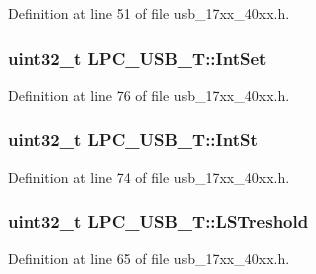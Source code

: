 Definition at line 51 of file usb\+\_\+17xx\+\_\+40xx.\+h.

\subsubsection[{\texorpdfstring{Int\+Set}{IntSet}}]{ uint32\+\_\+t L\+P\+C\+\_\+\+U\+S\+B\+\_\+\+T\+::\+Int\+Set}\hypertarget{structLPC__USB__T_a488e9c8d68d0ec88dd676f1349ac2723}{}\label{structLPC__USB__T_a488e9c8d68d0ec88dd676f1349ac2723}


Definition at line 76 of file usb\+\_\+17xx\+\_\+40xx.\+h.

\subsubsection[{\texorpdfstring{Int\+St}{IntSt}}]{ uint32\+\_\+t L\+P\+C\+\_\+\+U\+S\+B\+\_\+\+T\+::\+Int\+St}\hypertarget{structLPC__USB__T_aaf1cf56868212831767e9907378a342e}{}\label{structLPC__USB__T_aaf1cf56868212831767e9907378a342e}


Definition at line 74 of file usb\+\_\+17xx\+\_\+40xx.\+h.

\subsubsection[{\texorpdfstring{L\+S\+Treshold}{LSTreshold}}]{ uint32\+\_\+t L\+P\+C\+\_\+\+U\+S\+B\+\_\+\+T\+::\+L\+S\+Treshold}\hypertarget{structLPC__USB__T_a74f280455d6d03c7ad07a72b316acc14}{}\label{structLPC__USB__T_a74f280455d6d03c7ad07a72b316acc14}


Definition at line 65 of file usb\+\_\+17xx\+\_\+40xx.\+h.

